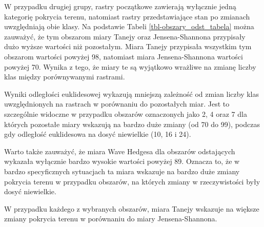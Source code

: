 \documentclass{amuthesis}
\begin{document}
W przypadku drugiej grupy, rastry początkowe zawierają wyłącznie jedną
kategorię pokrycia terenu, natomiast rastry przedstawiające stan po
zmianach uwzględniają obie klasy. Na podstawie Tabeli
\ref{tbl-obszary_odst_tabela} można zauważyć, że tym obszarom miary
Tanejy oraz Jensena-Shannona przypisały dużo wyższe wartości niż
pozostałym. Miara Tanejy przypisała wszystkim tym obszarom wartości
powyżej 98, natomiast miara Jensena-Shannona wartości powyżej 70. Wynika
z tego, że miary te są wyjątkowo wrażliwe na zmianę liczby klas między
porównywanymi rastrami.

Wyniki odległości euklidesowej wykazują mniejszą zależność od zmian
liczby klas uwzględnionych na rastrach w porównaniu do pozostałych miar.
Jest to szczególnie widoczne w przypadku obszarów oznaczonych jako 2, 4
oraz 7 dla których pozostałe miary wskazują na bardzo duże zmiany (od 70
do 99), podczas gdy odległość euklidesowa na dosyć niewielkie (10, 16 i
24).

Warto także zauważyć, że miara Wave Hedgesa dla obszarów odstających
wykazała wyłącznie bardzo wysokie wartości powyżej 89. Oznacza to, że w
bardzo specyficznych sytuacjach ta miara wskazuje na bardzo duże zmiany
pokrycia terenu w przypadku obszarów, na których zmiany w rzeczywistości
były dosyć niewielkie.

W przypadku każdego z wybranych obszarów, miara Tanejy wskazuje na
większe zmiany pokrycia terenu w porównaniu do miary Jensena-Shannona.
\end{document}
